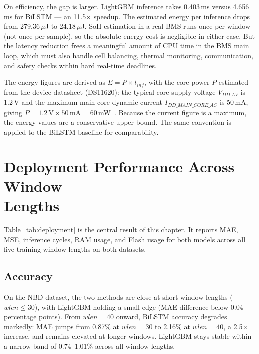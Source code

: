 On efficiency, the gap is larger. LightGBM inference takes 0.403\,ms versus 4.656\,ms for BiLSTM --- an 11.5$\times$ speedup. The estimated energy per inference drops from 279.36\,$\mu$J to 24.18\,$\mu$J. SoH estimation in a real BMS runs once per window (not once per sample), so the absolute energy cost is negligible in either case. But the latency reduction frees a meaningful amount of CPU time in the BMS main loop, which must also handle cell balancing, thermal monitoring, communication, and safety checks within hard real-time deadlines.

The energy figures are derived as $E = P \times t_{inf}$, with the core power $P$ estimated from the device datasheet (DS11620): the typical core supply voltage $V_{DD\_LV}$ is 1.2\,V and the maximum main-core dynamic current $I_{DD\_MAIN\_CORE\_AC}$ is 50\,mA, giving $P = 1.2\,\text{V} \times 50\,\text{mA} = 60$\,mW~\autocite{spc58ec80e5_ds}. Because the current figure is a maximum, the energy values are a conservative upper bound. The same convention is applied to the BiLSTM baseline for comparability.


\section[Deployment Performance Across Window Lengths]{Deployment Performance Across Window\\Lengths}
\label{sec:exp_deployment}

Table~\ref{tab:deployment} is the central result of this chapter. It reports MAE, MSE, inference cycles, RAM usage, and Flash usage for both models across all five training window lengths on both datasets.

\subsection{Accuracy}

On the NBD dataset, the two methods are close at short window lengths ($wlen \leq 30$), with LightGBM holding a small edge (MAE difference below 0.04 percentage points). From $wlen = 40$ onward, BiLSTM accuracy degrades markedly: MAE jumps from 0.87\% at $wlen = 30$ to 2.16\% at $wlen = 40$, a 2.5$\times$ increase, and remains elevated at longer windows. LightGBM stays stable within a narrow band of 0.74--1.01\% across all window lengths.


